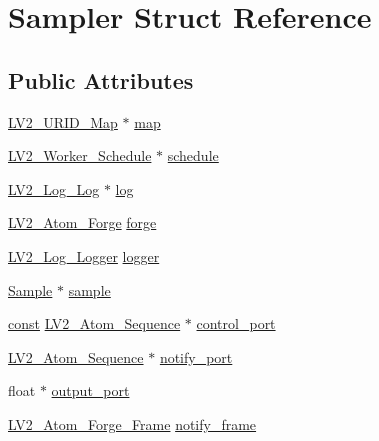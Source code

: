 \hypertarget{struct_sampler}{}\section{Sampler Struct Reference}
\label{struct_sampler}
\subsection*{Public Attributes}
\begin{DoxyCompactItemize}
\item 
\hyperlink{urid_8h_afefb42cd271f750506a8739f73c098c5}{L\+V2\+\_\+\+U\+R\+I\+D\+\_\+\+Map} $\ast$ \hyperlink{struct_sampler_af2ad6638202d7e322f367877d85be7fc}{map}
\item 
\hyperlink{worker_8h_ab9027676bc26c4299f0b75f9669424dd}{L\+V2\+\_\+\+Worker\+\_\+\+Schedule} $\ast$ \hyperlink{struct_sampler_ad2e8bda45d0ae82f09548b287c0a8689}{schedule}
\item 
\hyperlink{lv2_2lv2_2lv2_2lv2plug_8in_2ns_2ext_2log_2log_8h_a80f0e839a976477f3133ca6353a42bbc}{L\+V2\+\_\+\+Log\+\_\+\+Log} $\ast$ \hyperlink{struct_sampler_a4444199f1dd08ec7ebde6103947d08f1}{log}
\item 
\hyperlink{struct_l_v2___atom___forge}{L\+V2\+\_\+\+Atom\+\_\+\+Forge} \hyperlink{struct_sampler_a9a2189ced88a512b6411c6d94fe67088}{forge}
\item 
\hyperlink{struct_l_v2___log___logger}{L\+V2\+\_\+\+Log\+\_\+\+Logger} \hyperlink{struct_sampler_a9dcaeef536e632b1a4476256cda55554}{logger}
\item 
\hyperlink{struct_sample}{Sample} $\ast$ \hyperlink{struct_sampler_a99dbeeb8d3bd007739da9d426eb3f39d}{sample}
\item 
\hyperlink{getopt1_8c_a2c212835823e3c54a8ab6d95c652660e}{const} \hyperlink{struct_l_v2___atom___sequence}{L\+V2\+\_\+\+Atom\+\_\+\+Sequence} $\ast$ \hyperlink{struct_sampler_ab10b00c021e999dffb85947d2794cda1}{control\+\_\+port}
\item 
\hyperlink{struct_l_v2___atom___sequence}{L\+V2\+\_\+\+Atom\+\_\+\+Sequence} $\ast$ \hyperlink{struct_sampler_adc0780a3a98841f9716b4e3488fb9aa7}{notify\+\_\+port}
\item 
float $\ast$ \hyperlink{struct_sampler_af8ce4c1bdf2266e631813a284523dde6}{output\+\_\+port}
\item 
\hyperlink{forge_8h_a17754ac32fadfa54b73978e8a535065b}{L\+V2\+\_\+\+Atom\+\_\+\+Forge\+\_\+\+Frame} \hyperlink{struct_sampler_ad0b3efe284f8b3be723e1303111c1e3d}{notify\+\_\+frame}
\item 

\end{DoxyCompactItemize}
